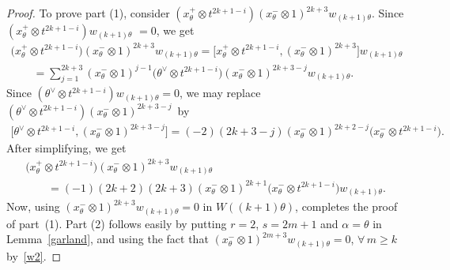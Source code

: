 \documentclass[10pt,a4paper]{amsart}
\begin{document}
\begin{proof}
To prove part (1), consider $(x^{+}_{\theta}\!\otimes t^{2k{+}1{-}i}) (x^{-}_{\theta}\otimes 1)^{2k{+}3}w_{(k{+}1)\theta}$.
Since $(x^{+}_{\theta}\!\otimes t^{2k{+}1{-}i})w_{(k{+}1)\theta}$ $=0$, we get
\begin{gather*}
\big(x^{+}_{\theta}\otimes t^{2k+1-i}\big) (x^{-}_{\theta}\otimes 1)^{2k+3}w_{(k+1)\theta}
=\big[x^{+}_{\theta}\otimes t^{2k+1-i}, (x^{-}_{\theta}\otimes 1)^{2k+3}\big] w_{(k+1)\theta}
\\
\qquad{}
=\sum\limits_{j=1}^{2k+3}  (x^{-}_{\theta}\otimes 1)^{j-1}\big(\theta^{\vee}\otimes t^{2k+1-i}\big)(x^{-}_{\theta}\otimes
1)^{2k+3-j}w_{(k+1)\theta}.
\end{gather*}
Since $(\theta^{\vee}\otimes t^{2k+1-i})w_{(k+1)\theta}=0$, we may replace $(\theta^{\vee}\otimes
t^{2k+1-i})(x^{-}_{\theta}\otimes 1)^{2k+3-j}$~by
\begin{gather*}
\big[\theta^{\vee}\otimes t^{2k+1-i}, (x^{-}_{\theta}\otimes 1)^{2k+3-j}\big]
=(-2)(2k+3-j)(x^{-}_{\theta}\otimes 1)^{2k+2-j}\big(x^{-}_{\theta}\otimes t^{2k+1-i}\big).
\end{gather*}
After simplifying, we get
\begin{gather*}
\big(x^{+}_{\theta}\otimes t^{2k+1-i}\big) (x^{-}_{\theta}\otimes 1)^{2k+3}w_{(k+1)\theta}
\\
\qquad{}
=(-1)(2k+2)(2k+3)(x^{-}_{\theta}\otimes 1)^{2k+1}\big(x^{-}_{\theta}\otimes t^{2k+1-i}\big)w_{(k+1)\theta}.
\end{gather*}
Now, using $(x^{-}_{\theta}\otimes 1)^{2k+3}w_{(k+1)\theta}=0$ in $W((k+1)\theta)$, completes the proof of part~(1).
Part (2) follows easily by putting $r=2$, $s=2m+1$ and $\alpha=\theta$ in Lemma~\ref{garland}, and using the fact that
$(x^{-}_{\theta}\otimes 1)^{2m+3}w_{(k+1)\theta}=0$, $\forall\,
m\geq k$ by~\eqref{w2}.
\end{proof}
\end{document}
